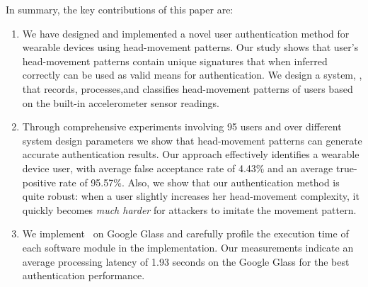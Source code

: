 
In summary, the key contributions of this paper are:

\begin{enumerate}

\item We have designed and implemented a novel user authentication method for wearable devices
using head-movement patterns. Our study shows that user's head-movement patterns
contain unique signatures that when inferred correctly can be used as valid
means for authentication. We design a system, \systemname, that records, processes,and classifies
head-movement patterns of users based on the built-in accelerometer sensor readings.


\item %
Through comprehensive experiments
involving 95 users and over
different system design parameters we show that head-movement patterns
can generate accurate authentication results. Our approach effectively identifies a wearable device user, with average false
acceptance rate of 4.43\% and an average true-positive rate of 95.57\%. Also, we show that our authentication method is quite robust: when a user slightly increases her head-movement complexity, it quickly becomes \emph{much harder} for attackers to imitate the movement pattern.



\item We implement \systemname~on Google Glass and carefully profile the
execution time of each software module in the implementation. Our measurements
indicate an average processing latency of 1.93 seconds on the Google Glass for the best authentication performance.

\end{enumerate}

